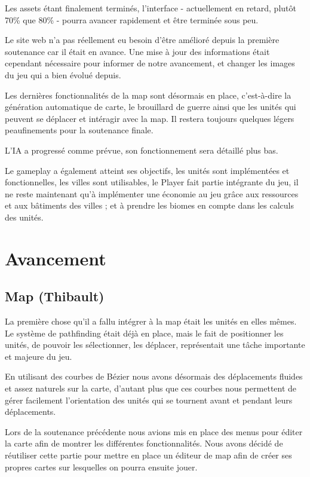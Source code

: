 \documentclass[12pt]{report}
\begin{document}
\vspace{0.5cm}

Les assets étant finalement terminés, l’interface - actuellement en retard,
plutôt 70\% que 80\% - pourra avancer rapidement et être terminée sous peu.

Le site web n’a pas réellement eu besoin d’être amélioré depuis la première
soutenance car il était en avance. Une mise à jour des informations était
cependant nécessaire pour informer de notre avancement, et changer les images du
jeu qui a bien évolué depuis.

Les dernières fonctionnalités de la map sont désormais en place, c'est-à-dire la
génération automatique de carte, le brouillard de guerre ainsi que les unités
qui peuvent se déplacer et intéragir avec la map. Il restera toujours quelques
légers peaufinements pour la soutenance finale.

L’IA a progressé comme prévue, son fonctionnement sera détaillé plus bas.

Le gameplay a également atteint ses objectifs, les unités sont implémentées et
fonctionnelles, les villes sont utilisables, le Player fait partie intégrante
du jeu, il ne reste maintenant qu’à implémenter une économie au jeu grâce aux
ressources et aux bâtiments des villes ; et à prendre les biomes en compte dans
les calculs des unités.

\chapter{Avancement}

\section{Map (Thibault)}

La première chose qu'il a fallu intégrer à la map était les unités en elles
mêmes. Le système de pathfinding était déjà en place, mais le fait de
positionner les unités, de pouvoir les sélectionner, les déplacer, représentait
une tâche importante et majeure du jeu. 

En utilisant des courbes de Bézier nous avons désormais des déplacements fluides
et assez naturels sur la carte, d'autant plus que ces courbes nous permettent de
gérer facilement l'orientation des unités qui se tournent avant et pendant leurs
déplacements.

Lors de la soutenance précédente nous avions mis en place des menus pour éditer
la carte afin de montrer les différentes fonctionnalités. Nous avons décidé de
réutiliser cette partie pour mettre en place un éditeur de map afin de créer ses
propres cartes sur lesquelles on pourra ensuite jouer.
\end{document}
